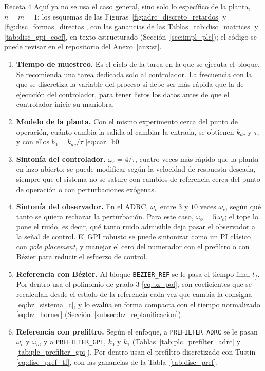 \begin{recuadro}{Receta 4}
Aquí ya no se usa el caso general, sino solo lo específico de la planta, $n = m = 1$: los esquemas de
las Figuras~\ref{fig:adrc_discreto_retardos} y \ref{fig:disc_formas_directas}, con las ganancias de las
Tablas~\ref{tab:disc_matrices} y \ref{tab:disc_gpi_coef}, en texto estructurado
(Sección~\ref{sec:impl_plc}); el código se puede revisar en el repositorio del Anexo~\ref{anx:st}.
\begin{enumerate}\setlength{\itemsep}{2pt}
  \item \textbf{Tiempo de muestreo.} Es el ciclo de la tarea en la que se ejecuta el bloque. Se
  recomienda una tarea dedicada solo al controlador. La frecuencia con la que se discretiza la
  variable del proceso sí debe ser más rápida que la de ejecución del controlador, para tener listos
  los datos antes de que el controlador inicie su maniobra.
  \item \textbf{Modelo de la planta.} Con el mismo experimento cerca del punto de operación, cuánto
  cambia la salida al cambiar la entrada, se obtienen $k_{dc}$ y $\tau$, y con ellos
  $b_0 = k_{dc}/\tau$ \eqref{eq:car_b0}.
  \item \textbf{Sintonía del controlador.} $\omega_c = 4/\tau$, cuatro veces más rápido que la planta
  en lazo abierto; se puede modificar según la velocidad de respuesta deseada, siempre que el sistema
  no se sature con cambios de referencia cerca del punto de operación o con perturbaciones exógenas. 
  \item \textbf{Sintonía del observador.} En el ADRC, $\omega_o$ entre $3$ y $10$ veces $\omega_c$,
  según qué tanto se quiera rechazar la perturbación. Para este caso, $\omega_o = 5\,\omega_c$;
  el tope lo pone el ruido,
  es decir, qué tanto ruido admisible deja pasar el observador a la señal de control. El GPI robusto se puede sintonizar como un PI clásico
  con \emph{pole placement}, y manejar el cero del numerador con el prefiltro o con Bézier para
  reducir el esfuerzo de control.
  \item \textbf{Referencia con Bézier.} Al bloque \texttt{BEZIER\_REF} se le pasa el tiempo final
  $t_f$. Por dentro usa el polinomio de grado $3$ \eqref{eq:bz_pol}, con coeficientes que se
  recalculan desde el estado de la referencia cada vez que cambia la consigna \eqref{eq:bz_sistema_c},
  y lo evalúa en forma compacta con el tiempo normalizado \eqref{eq:bz_horner}
  (Sección~\ref{subsec:bz_replanificacion}).
  \item \textbf{Referencia con prefiltro.} Según el enfoque, a \texttt{PREFILTER\_ADRC} se le pasan
  $\omega_c$ y $\omega_o$, y a \texttt{PREFILTER\_GPI}, $k_0$ y $k_1$
  (Tablas~\ref{tab:plc_prefilter_adrc} y \ref{tab:plc_prefilter_gpi}). Por dentro usan el prefiltro
  discretizado con Tustin \eqref{eq:disc_pref_tf}, con las ganancias de la Tabla~\ref{tab:disc_pref}.
\end{enumerate}
\end{recuadro}
